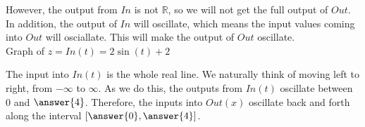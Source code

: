\documentclass{ximera}
\begin{document}
\begin{example}
\begin{explanation}
However, the output from $In$ is not $\mathbb{R}$, so we will not get the full output of $Out$. In addition, the output of $In$ will oscillate, which means the input values coming into $Out$ will osciallate.  This will make the output of $Out$ oscillate. \\






Graph of $z = In(t) = 2 \sin(t)+2$





\begin{image}
\end{image}




The input into $In(t)$ is the whole real line.  We naturally think of moving left to right, from $-\infty$ to $\infty$.  As we do this, the outputs from $In(t)$ oscillate between $0$ and $\answer{4}$.  Therefore, the inputs into $Out(x)$ oscillate back and forth along the interval $\left[ \answer{0}, \answer{4} \right]$.






\end{explanation}
\end{example}
\end{document}
